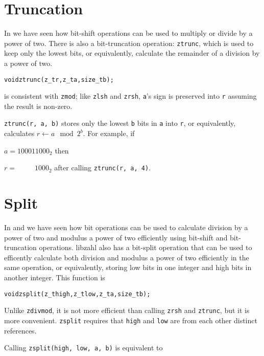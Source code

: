 \newpage
\section{Truncation}
\label{sec:Truncation}

In  we have seen how bit-shift
operations can be used to multiply or divide by a
power of two. There is also a bit-truncation
operation: {\tt ztrunc}, which is used to keep
only the lowest bits, or equivalently, calculate
the remainder of a division by a power of two.

\begin{alltt}
   void ztrunc(z_t r, z_t a, size_t b);
\end{alltt}

\noindent
is consistent with {\tt zmod}; like {\tt zlsh} and
{\tt zrsh}, {\tt a}'s sign is preserved into {\tt r}
assuming the result is non-zero.

{\tt ztrunc(r, a, b)} stores only the lowest {\tt b}
bits in {\tt a} into {\tt r}, or equivalently,
calculates $r \gets a \mod 2^b$. For example, if

$a = 100011000_2$ then

$r = \phantom{10001}1000_2$ after calling
{\tt ztrunc(r, a, 4)}.


\newpage
\section{Split}
\label{sec:Split}

In  and 
we have seen how bit operations can be used to
calculate division by a power of two and
modulus a power of two efficiently using
bit-shift and bit-truncation operations. libzahl
also has a bit-split operation that can be used
to efficently calculate both division and
modulus a power of two efficiently in the same
operation, or equivalently, storing low bits
in one integer and high bits in another integer.
This function is

\begin{alltt}
   void zsplit(z_t high, z_t low, z_t a, size_t b);
\end{alltt}

\noindent
Unlike {\tt zdivmod}, it is not more efficient
than calling {\tt zrsh} and {\tt ztrunc}, but
it is more convenient. {\tt zsplit} requires
that {\tt high} and {\tt low} are from each
other distinct references.

Calling {\tt zsplit(high, low, a, b)} is
equivalent to

